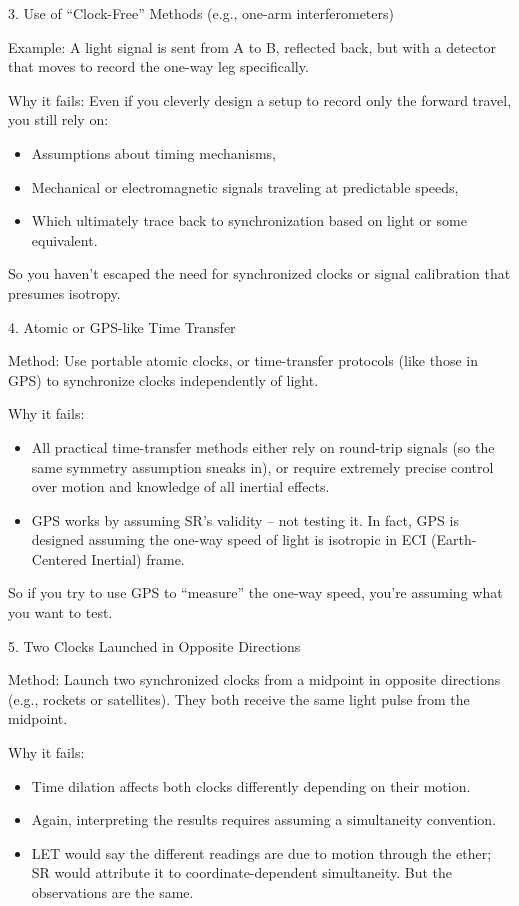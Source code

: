 \documentclass[a4paper]{article}
\theoremstyle{plain}
\theoremstyle{definition}
\begin{document}
3. Use of ``Clock-Free'' Methods (e.g., one-arm interferometers)

Example: A light signal is sent from A to B, reflected back, but with
a detector that moves to record the one-way leg specifically.

Why it fails: Even if you cleverly design a setup to record only the
forward travel, you still rely on:
\begin{itemize}
\item Assumptions about timing mechanisms,
\item Mechanical or electromagnetic signals traveling at predictable
  speeds,
\item Which ultimately trace back to synchronization based on light or
  some equivalent.
\end{itemize}
So you haven't escaped the need for synchronized clocks or signal
calibration that presumes isotropy.

4. Atomic or GPS-like Time Transfer

Method: Use portable atomic clocks, or time-transfer protocols (like
those in GPS) to synchronize clocks independently of light.

Why it fails:
\begin{itemize}
\item All practical time-transfer methods either rely on round-trip
  signals (so the same symmetry assumption sneaks in), or require
  extremely precise control over motion and knowledge of all inertial
  effects.
\item GPS works by assuming SR's validity -- not testing it.  In fact,
  GPS is designed assuming the one-way speed of light is isotropic in
  ECI (Earth-Centered Inertial) frame.
\end{itemize}
So if you try to use GPS to ``measure'' the one-way speed, you're
assuming what you want to test.

5. Two Clocks Launched in Opposite Directions

Method: Launch two synchronized clocks from a midpoint in opposite
directions (e.g., rockets or satellites).  They both receive the same
light pulse from the midpoint.

Why it fails:
\begin{itemize}
\item Time dilation affects both clocks differently depending on their
  motion.
\item Again, interpreting the results requires assuming a simultaneity
  convention.
\item LET would say the different readings are due to motion through
  the ether; SR would attribute it to coordinate-dependent
  simultaneity.  But the observations are the same.
\end{itemize}
\end{document}
